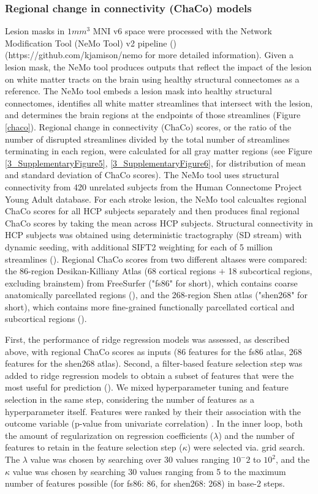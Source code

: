 \documentclass[phd,tocprelim]{cornell}
\def\Plus{\texttt{+}}
\begin{document}
\subsubsection{Regional change in connectivity (ChaCo) models}
Lesion masks in $1mm^3$ MNI v6 space were processed with the Network Modification Tool (NeMo Tool) v2 pipeline (\cite{Kuceyeski2013-nk}) (https://github.com/kjamison/nemo for more detailed information). Given a lesion mask, the NeMo tool produces outputs that reflect the impact of the lesion on white matter tracts on the brain using healthy structural connectomes as a reference. The NeMo tool embeds a lesion mask into healthy structural connectomes, identifies all white matter streamlines that intersect with the lesion, and determines the brain regions at the endpoints of those streamlines (Figure \ref{chaco}). Regional change in connectivity (ChaCo) scores, or the ratio of the number of disrupted streamlines divided by the total number of streamlines terminating in each region, were calculated for all gray matter regions (see Figure \ref{3_SupplementaryFigure5}, \ref{3_SupplementaryFigure6}, for distribution of mean and standard deviation of ChaCo scores). The NeMo tool uses structural connectivity from 420 unrelated subjects from the Human Connectome Project Young Adult database. For each stroke lesion, the NeMo tool calcualtes regional ChaCo scores for all HCP subjects separately and then produces final regional ChaCo scores by taking the mean across HCP subjects. Structural connectivity in HCP subjects was obtained using deterministic tractography (SD stream) with dynamic seeding, with additional SIFT2 weighting for each of 5 million streamlines (\cite{Smith2015-eb}). Regional ChaCo scores from two different altases were compared: the 86-region Desikan-Killiany Atlas (68 cortical regions $\Plus$ 18 subcortical regions, excluding brainstem) from FreeSurfer ("fs86" for short), which contains coarse anatomically parcellated regions (\cite{Desikan2006-vf,Fischl2002-lb}), and the 268-region Shen atlas ("shen268" for short), which contains more fine-grained functionally parcellated cortical and subcortical regions (\cite{Shen2013-zn}).

First, the performance of ridge regression models was assessed, as described above, with regional ChaCo scores as inputs (86 features for the fs86 atlas, 268 features for the shen268 atlas). Second, a filter-based feature selection step was added to ridge regression models to obtain a subset of features that were the most useful for prediction (\cite{Guyon2003-kj, Hall1999-qr, Pudjihartono2022-zg}). We mixed hyperparameter tuning and feature selection in the same step, considering the number of features as a hyperparameter itself. Features were ranked by their their association with the outcome variable (p-value from univariate correlation) . In the inner loop, both the amount of regularization on regression coefficients ($\lambda$) and the number of features to retain in the feature selection step ($\kappa$) were selected via. grid search. The $\lambda$ value was chosen by searching over 30 values ranging $10^-2$ to $10^2$, and the $\kappa$ value was chosen by searching 30 values ranging from 5 to the maximum number of features possible (for fs86: 86, for shen268: 268) in base-2 steps. 
\end{document}
